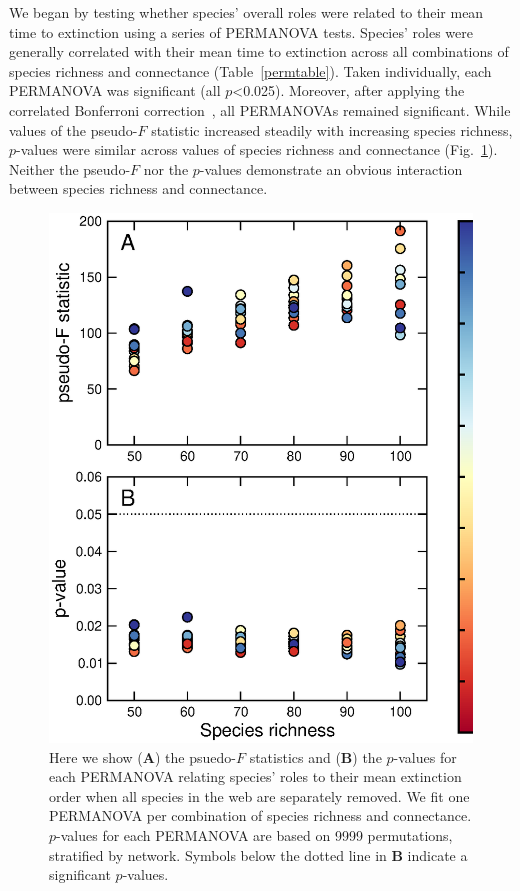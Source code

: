 \documentclass[12pt]{article}
\begin{document}
        We began by testing whether species' overall roles were related to their mean time to extinction using a series of PERMANOVA tests.
		Species' roles were generally correlated with their mean time to extinction across all combinations of species richness and connectance (Table~\ref{permtable}). Taken individually, each PERMANOVA was significant (all $p$\textless0.025). Moreover, after applying the correlated Bonferroni correction~\citep{Drezner2016}, all PERMANOVAs remained significant. While values of the pseudo-$F$ statistic increased steadily with increasing species richness, $p$-values were similar across values of species richness and connectance (Fig.~\ref{permfig}). Neither the pseudo-$F$ nor the $p$-values demonstrate an obvious interaction between species richness and connectance.



			\begin{figure}[hb!]
				\caption{Here we show (\textbf{A}) the psuedo-$F$ statistics and (\textbf{B}) the $p$-values for each PERMANOVA relating species' roles to their mean extinction order when all species in the web are separately removed. We fit one PERMANOVA per combination of species richness and connectance. $p$-values for each PERMANOVA are based on 9999 permutations, stratified by network. Symbols below the dotted line in \textbf{B} indicate a significant $p$-values.}
				\label{permfig}
				\includegraphics[height=.5\textheight]{figures/extinction_order/permanova_summary_paper_full.eps}
				\end{figure}
\end{document}
